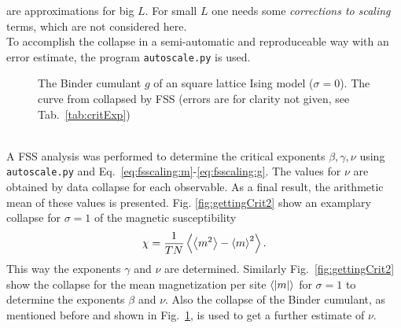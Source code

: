     are approximations for big \(L\). For small \(L\) one needs some
    \emph{corrections to scaling} terms, which are not considered here.\\
    To accomplish the collapse in a semi-automatic and reproduceable
    way with an error estimate, the program
    \texttt{autoscale.py} \cite{autoscale2009} is used.
    \begin{figure}[htbp]
        \centering
        \caption[Examples of Determining Critical Temperature and Exponents]
        {
             The Binder cumulant \(g\)
                of an square lattice Ising model (\(\sigma=0\)).
             The curve from 
                collapsed by FSS (errors are for clarity
                not given, see Tab.\ \ref{tab:critExp})
        }
        \label{fig:gettingCrit}
    \end{figure}\\
    A FSS analysis was
    performed to determine the critical exponents \(\beta, \gamma, \nu\)
    using \texttt{autoscale.py} \cite{autoscale2009} and Eq.\ \eqref{eq:fsscaling:m}-\eqref{eq:fsscaling:g}.
    The values for \(\nu\) are obtained by data collapse for each observable.
    As a final result, the arithmetic mean of these values is presented.
    Fig. \ref{fig:gettingCrit2}
    show an examplary collapse for \(\sigma=1\) of the magnetic susceptibility
    \begin{equation}
        \chi = \frac{1}{TN}\left< \left< m^2 \right> - \left< m \right>^2 \right>.
    \end{equation}
    This way the exponents \(\gamma\) and \(\nu\) are determined.
    Similarly Fig.\ \ref{fig:gettingCrit2}
    show the collapse for the mean magnetization per site \(\left< \left\vert m\right\vert \right>\) for \(\sigma=1\)
    to determine the exponents \(\beta\) and \(\nu\).
    Also the collapse of the Binder cumulant, as mentioned before and shown
    in Fig.\ \ref{fig:gettingCrit},
    is used to get a further estimate of \(\nu\).
